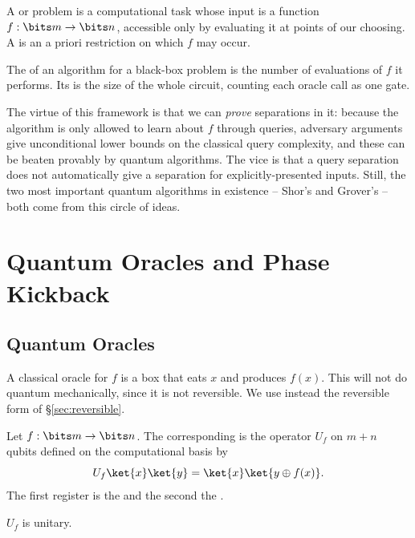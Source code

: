 \begin{definition}
	A  or  problem is a computational task whose input is a function $f:\bits m\to\bits n$, accessible only by evaluating it at points of our choosing. A  is an a priori restriction on which $f$ may occur.
\end{definition}

\begin{definition}
	The  of an algorithm for a black-box problem is the number of evaluations of $f$ it performs. Its  is the size of the whole circuit, counting each oracle call as one gate.
\end{definition}

The virtue of this framework is that we can \emph{prove} separations in it: because the algorithm is only allowed to learn about $f$ through queries, adversary arguments give unconditional lower bounds on the classical query complexity, and these can be beaten provably by quantum algorithms. The vice is that a query separation does not automatically give a separation for explicitly-presented inputs. Still, the two most important quantum algorithms in existence -- Shor's and Grover's -- both come from this circle of ideas.

\section{Quantum Oracles and Phase Kickback}

\subsection{Quantum Oracles}

A classical oracle for $f$ is a box that eats $x$ and produces $f(x)$. This will not do quantum mechanically, since it is not reversible. We use instead the reversible form of \S\ref{sec:reversible}.

\begin{definition}
	Let $f : \bits m\to\bits n$. The corresponding  is the operator $U_f$ on $m + n$ qubits defined on the computational basis by
	$$U_f\ket{x}\ket{y} = \ket{x}\ket{y\oplus f(x)}.$$
	The first register is the  and the second the .
\end{definition}

\begin{proposition}
	$U_f$ is unitary.
\end{proposition}

